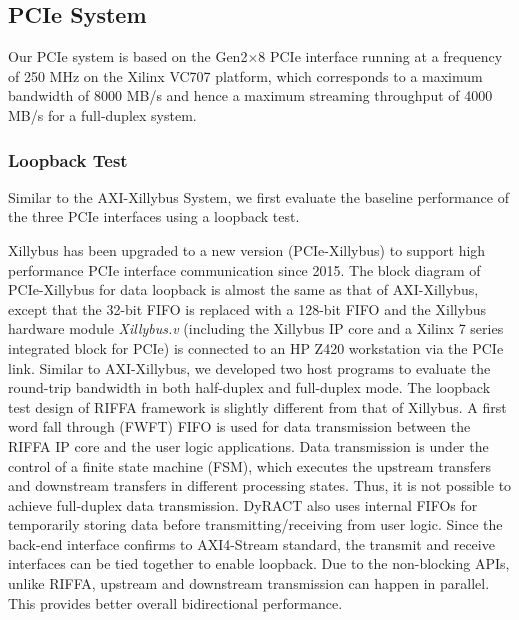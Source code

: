 \subsection{PCIe System}
Our PCIe system is based on the Gen2$\times$8 PCIe interface running at a frequency of 250 MHz on the Xilinx VC707 platform, which corresponds to a maximum bandwidth of 8000 MB/s and hence a maximum streaming throughput of 4000 MB/s for a full-duplex system. 


\subsubsection{Loopback Test}
Similar to the AXI-Xillybus System, we first evaluate the baseline performance of the three PCIe interfaces using a loopback test. 

Xillybus has been upgraded to a new version (PCIe-Xillybus) to support high performance PCIe interface communication since 2015. 
The block diagram of PCIe-Xillybus for data loopback is almost the same as that of AXI-Xillybus, except that the 32-bit FIFO is replaced with a 128-bit FIFO and the Xillybus hardware module \textit{Xillybus.v} (including the Xillybus IP core and a Xilinx 7 series integrated block for PCIe) is connected to an HP Z420 workstation via the PCIe link. 
Similar to AXI-Xillybus, we developed two host programs to evaluate the round-trip bandwidth in both half-duplex and full-duplex mode. 
The loopback test design of RIFFA framework is slightly different from that of Xillybus. 
A first word fall through (FWFT) FIFO is used for data transmission between the RIFFA IP core and the user logic applications. 
Data transmission is under the control of a finite state machine (FSM), which executes the upstream transfers and downstream transfers in different processing states.  
Thus, it is not possible to achieve full-duplex data transmission. 
DyRACT also uses internal FIFOs for temporarily storing data before transmitting/receiving from user logic.
Since the back-end interface confirms to AXI4-Stream standard, the transmit and receive interfaces can be tied together to enable loopback.
Due to the non-blocking APIs, unlike RIFFA, upstream and downstream transmission can happen in parallel.
This provides better overall bidirectional performance.

